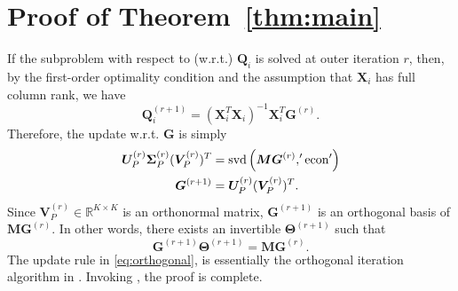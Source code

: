 \documentclass[10pt,journal]{IEEEtran}
\newcommand{\G}{\boldsymbol{G}}
\newcommand{\Q}{\boldsymbol{Q}}
\begin{document}
\section{Proof of Theorem~\ref{thm:main}}
If the subproblem with respect to (w.r.t.) ${\bm Q}_i$ is solved at outer iteration $r$,
then, by the first-order optimality condition and the assumption that ${\bm X}_i$ has full column rank, we have
\begin{equation}\label{eq:Qr1}
{\bm Q}_i^{(r+1)}=({\bm X}_i^T{\bm X}_i)^{-1}{\bm X}_i^T{\bm G}^{(r)}.
\end{equation}
Therefore, the update w.r.t. ${\bm G}$ is simply
\begin{subequations}\label{eq:MG}
\begin{align}
{\bm U}_P^{(r)}{\bm \Sigma}_P^{(r)}({\bm V}_P^{(r)})^T&={\rm svd}\left({\bm M}{\bm G}^{(r)},'{\rm econ}'\right) \label{eq:svd}\\
{\bm G}^{(r+1)}& = {\bm U}_P^{(r)}({\bm V}_P^{(r)})^T.
\end{align}
\end{subequations}
Since ${\bm V}_P^{(r)}\in\mathbb{R}^{K\times K}$ is an orthonormal matrix,
${\bm G}^{(r+1)}$ is an orthogonal basis of ${\bm M}{\bm G}^{(r)}$. In other words, there exists an invertible ${\bm \Theta}^{(r+1)}$ such that
\begin{equation}\label{eq:orthogonal}
  {\bm G}^{(r+1)}{\bm \Theta}^{(r+1)} = {\bm M}{\bm G}^{(r)}.
\end{equation}
The update rule in \eqref{eq:orthogonal}, is essentially the orthogonal iteration algorithm in \cite{GHGolub1996}.
Invoking \cite[Theorem 8.2.2]{GHGolub1996}, the proof is complete.
\end{document}
